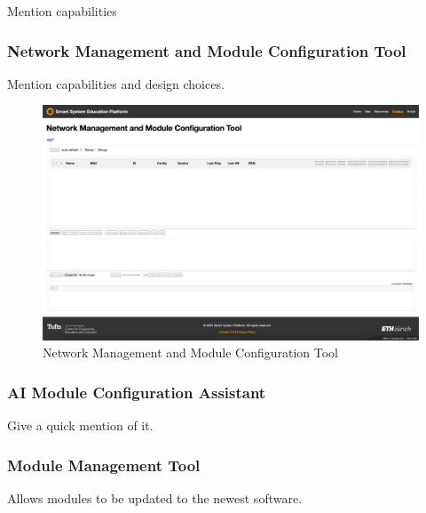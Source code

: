 Mention capabilities

\subsubsection{\label{sec:res_nmmct}Network Management and Module Configuration Tool}

Mention capabilities and design choices. 

\begin{figure}[H]
    \centering
    \includegraphics[width=\linewidth]{overleaf/images/nmmct_raw.png}
    \vspace{\ftspace}
    \caption{Network Management and Module Configuration Tool}
    \vspace{\ftspace}
    \label{fig:nmmct_raw}
\end{figure}

\subsubsection{\label{sec:res_ai_config}AI Module Configuration Assistant}

Give a quick mention of it.

\subsubsection{\label{sec:res_mmt}Module Management Tool}

Allows modules to be updated to the newest software. 

